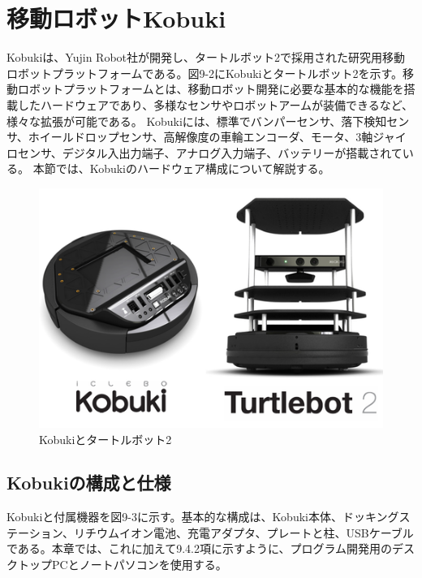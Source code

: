 \section{移動ロボットKobuki}


Kobukiは、Yujin Robot社が開発し、タートルボット2で採用された研究用移動ロボットプラットフォームである。図9-2にKobukiとタートルボット2を示す。移動ロボットプラットフォームとは、移動ロボット開発に必要な基本的な機能を搭載したハードウェアであり、多様なセンサやロボットアームが装備できるなど、様々な拡張が可能である。  Kobukiには、標準でバンパーセンサ、落下検知センサ、ホイールドロップセンサ、高解像度の車輪エンコーダ、モータ、3軸ジャイロセンサ、デジタル入出力端子、アナログ入力端子、バッテリーが搭載されている。  本節では、Kobukiのハードウェア構成について解説する。

\begin{figure}[ht]
  \centering
  \includegraphics[width=\columnwidth]{pictures/chapter9/pic_09_02.png}
  \caption{Kobukiとタートルボット2}
\end{figure}


\subsection{Kobukiの構成と仕様}

Kobukiと付属機器を図9-3に示す。基本的な構成は、Kobuki本体、ドッキングステーション、リチウムイオン電池、充電アダプタ、プレートと柱、USBケーブルである。本章では、これに加えて9.4.2項に示すように、プログラム開発用のデスクトップPCとノートパソコンを使用する。


